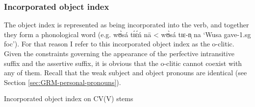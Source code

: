 \begin{exe}
\begin{exe}
\begin{exe}
{\begin{exe}
\begin{exe}
\begin{exe}
\begin{exe}
\begin{exe}
\begin{exe}
\begin{exe}
\begin{exe}
\begin{exe}
\begin{exe}
\begin{exe}
\begin{exe}
\begin{exe}
\begin{exe}
\begin{exe}
\begin{exe}
\begin{exe}
\begin{exe}
\begin{exe}
\begin{exe}
\begin{exe}
\subsubsection{Incorporated object index}
\label{sec:GRM-morph-opro}


The object index  is represented as being incorporated into the verb,  and 
together they form a phonological word (e.g.  {\sls wʊ̀sá tɪ́ɛ́ń nā} < {\sls 
wʊ̀sá tɪɛ-n̩ na}  `Wusa gave-{\sc 1.sg} {\sc foc}').  For that reason I refer 
to this incorporated object index as the {\sc o}-clitic. Given the constraints 
governing the appearance of the perfective intransitive suffix and the 
assertive 
suffix, it is obvious that the {\sc o}-clitic cannot coexist with any of them. 
Recall that the  weak subject and object  pronouns are identical (see Section 
\ref{sec:GRM-personal-pronouns}).

\begin{table}[!htb]
\centering
\caption{Incorporated object index on  CV(V) stems\label{tab:object-clitic}}


\end{table}
\end{exe}
\end{exe}
\end{exe}
\end{exe}
\end{exe}
\end{exe}
\end{exe}
\end{exe}
\end{exe}
\end{exe}
\end{exe}
\end{exe}
\end{exe}
\end{exe}
\end{exe}
\end{exe}
\end{exe}
\end{exe}
\end{exe}
\end{exe}
\end{exe}}
\end{exe}
\end{exe}
\end{exe}
